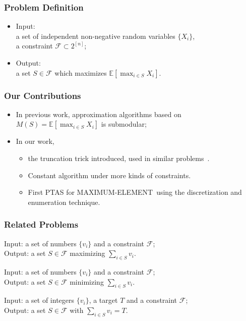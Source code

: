 \documentclass{beamer}
\newcommand{\calF}{{\mathcal F}}
\newcommand{\Exp}{{\mathbb{E}}}
\newcommand{\MM}{{\textsf{MAXIMUM-ELEMENT}}}
\begin{document}
\begin{frame}
    \frametitle{Problem Definition}
    \begin{problem}[\MM]
        \begin{itemize}
            \item Input:\\
                a set of independent non-negative random variables $\{X_i\}$,\\
                a constraint $\calF \subset 2^{[n]}$;
            \item Output:\\ a set $S\in \calF$ which maximizes $\Exp[\max_{i\in S} X_i]$.
        \end{itemize}
    \end{problem}
\end{frame}

\begin{frame}
\frametitle{Our Contributions}
\begin{itemize}
    \item In previous work, approximation algorithms based on $M(S) = \Exp[\max_{i\in S} X_i]$ is submodular; 
    \item In our work, 
        \begin{itemize}
            \item the truncation trick introduced, used in similar problems~\cite{kleinberg2000allocating,guha2009exceeding}. 
            \item Constant algorithm under more kinds of constraints.
            \item First PTAS for \MM\ using the discretization and enumeration technique.
        \end{itemize}
\end{itemize}
\end{frame}


\begin{frame}
    \frametitle{Related Problems}
    \begin{problem}
        Input: a set of numbers $\{v_i\}$ and a constraint $\calF$;\\
        Output: a set $S\in \calF$ maximizing $\sum_{i\in S} v_i$.
    \end{problem}
    \begin{problem}
        Input: a set of numbers $\{v_i\}$ and a constraint $\calF$;\\
        Output: a set $S\in\calF$ minimizing $\sum_{i\in S} v_i$.
    \end{problem}
    \begin{problem}
        Input: a set of integers $\{v_i\}$, a target $T$ and a constraint $\calF$;\\
        Output: a set $S\in \calF$ with $\sum_{i\in S} v_i = T$.
    \end{problem}
\end{frame}
\end{document}
